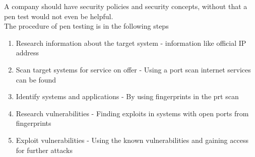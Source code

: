 \documentclass[12pt, a4paper]{article}
\begin{document}
		A company should have security policies and security concepts, without that a pen test would not even be helpful.\\
		The procedure of pen testing is in the following steps
		\begin{enumerate}
			\item Research information about the target system - information like official IP address
			\item Scan target systems for service on offer - Using a port scan internet services can be found
			\item Identify systems and applications - By using fingerprints in the prt scan
			\item Research vulnerabilities - Finding exploits in systems with open ports from fingerprints
			\item Exploit vulnerabilities - Using the known vulnerabilities and gaining access for further attacks
		\end{enumerate}
\end{document}
